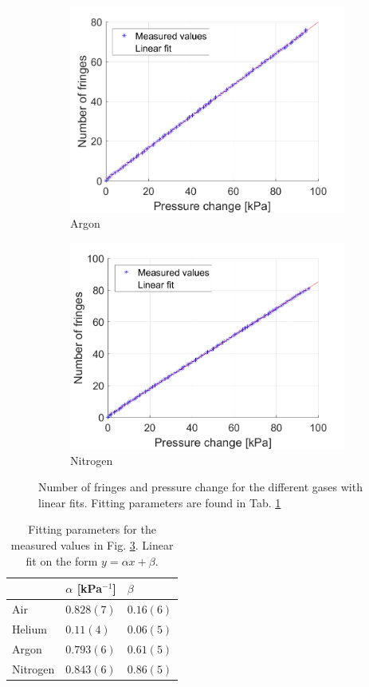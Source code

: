\begin{figure}[H]
\begin{subfigure}{0.49\textwidth}
    \includegraphics[width=\textwidth]{matlab/Argon}
    \caption{Argon}
    \label{fig:Argon}
  \end{subfigure}
  \begin{subfigure}{0.49\textwidth}
    \includegraphics[width=\textwidth]{matlab/Nitrogen}
    \caption{Nitrogen}
    \label{fig:Nitrogen}
  \end{subfigure}
  \caption{Number of fringes and pressure change for the different gases with linear fits. Fitting parameters are found in Tab. \ref{tab:linearFits}}
  \label{fig:measurements}
\end{figure}

\begin{table}[H]
  \centering
  \caption{Fitting parameters for the measured values in Fig. \ref{fig:measurements}. Linear fit on the form $y=\alpha x + \beta$.}
  \label{tab:linearFits}
  \begin{tabular}{l|l|l}
           & $\alpha$ [kPa$^{-1}$]& $\beta$ \\ \hline
  Air      & $0.828(7)$  & $0.16(6)$ \\
  Helium   & $0.11(4)$ & $0.06(5)$ \\
  Argon    & $0.793(6)$ & $0.61(5)$ \\
  Nitrogen & $0.843(6)$ & $0.86(5)$
  \end{tabular}
\end{table}

